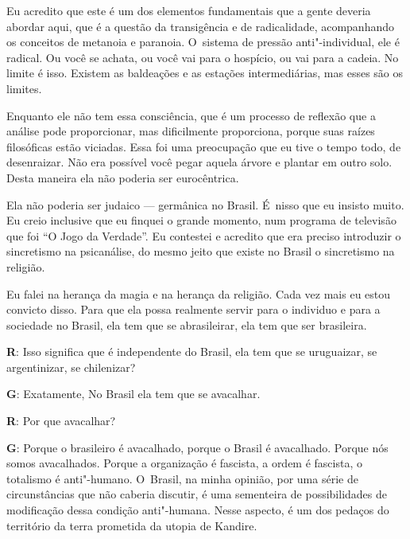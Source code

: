  

Eu acredito que este é um dos elementos fundamentais que a gente deveria
abordar aqui, que é a questão da transigência e de radicalidade,
acompanhando os conceitos de metanoia e paranoia. O~sistema de pressão
anti"-individual, ele é radical. Ou você se achata, ou você vai para o
hospício, ou vai para a cadeia. No limite é isso. Existem as baldeações
e as estações intermediárias, mas esses são os limites.

 

Enquanto ele não tem essa consciência, que é um processo de reflexão que
a análise pode proporcionar, mas dificilmente proporciona, porque suas
raízes filosóficas estão viciadas. Essa foi uma preocupação que eu tive
o tempo todo, de desenraizar. Não era possível você pegar aquela árvore
e plantar em outro solo. Desta maneira ela não poderia ser eurocêntrica.

 

Ela não poderia ser judaico --- germânica no Brasil. É~nisso que eu
insisto muito. Eu creio inclusive que eu finquei o grande momento, num
programa de televisão que foi ``O Jogo da Verdade''. Eu contestei e
acredito que era preciso introduzir o sincretismo na psicanálise, do
mesmo jeito que existe no Brasil o sincretismo na religião.

 

Eu falei na herança da magia e na herança da religião. Cada vez mais eu
estou convicto disso. Para que ela possa realmente servir para o
individuo e para a sociedade no Brasil, ela tem que se abrasileirar, ela
tem que ser brasileira.

 

\textbf{R}: Isso significa que é independente do Brasil, ela tem que se
uruguaizar, se argentinizar, se chilenizar?

 

\textbf{G}: Exatamente, No Brasil ela tem que se avacalhar.

 

\textbf{R}: Por que avacalhar?

 

\textbf{G}: Porque o brasileiro é avacalhado, porque o Brasil é
avacalhado. Porque nós somos avacalhados. Porque a organização é
fascista, a ordem é fascista, o totalismo é anti"-humano. O~Brasil, na
minha opinião, por uma série de circunstâncias que não caberia discutir,
é uma sementeira de possibilidades de modificação dessa condição
anti"-humana. Nesse aspecto, é um dos pedaços do território da terra
prometida da utopia de Kandire.

